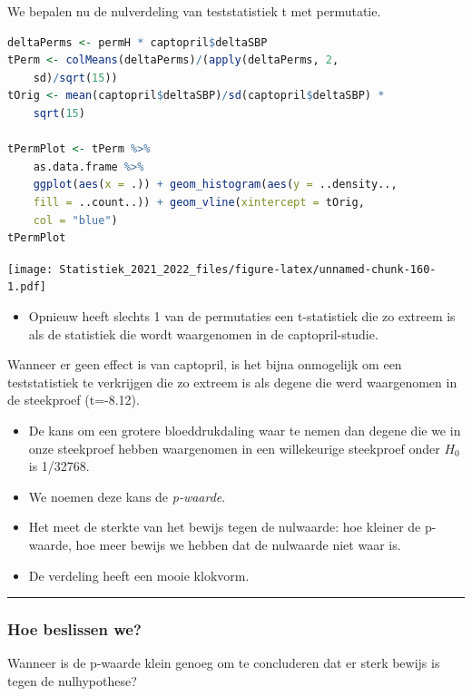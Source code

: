 \documentclass[
  12pt,dutch,coursenotes]{book}
\providecommand{\tightlist}{%
  \setlength{\itemsep}{0pt}\setlength{\parskip}{0pt}}
\theoremstyle{definition}
\theoremstyle{definition}
\theoremstyle{definition}
\theoremstyle{definition}
\theoremstyle{remark}
\begin{document}
We bepalen nu de nulverdeling van teststatistiek t met permutatie.

\begin{lstlisting}[language=R]
deltaPerms <- permH * captopril$deltaSBP
tPerm <- colMeans(deltaPerms)/(apply(deltaPerms, 2,
    sd)/sqrt(15))
tOrig <- mean(captopril$deltaSBP)/sd(captopril$deltaSBP) *
    sqrt(15)

tPermPlot <- tPerm %>%
    as.data.frame %>%
    ggplot(aes(x = .)) + geom_histogram(aes(y = ..density..,
    fill = ..count..)) + geom_vline(xintercept = tOrig,
    col = "blue")
tPermPlot
\end{lstlisting}

\texttt{[image: Statistiek\_2021\_2022\_files/figure-latex/unnamed-chunk-160-1.pdf]}

\begin{itemize}
\tightlist
\item
  Opnieuw heeft slechts 1 van de permutaties een t-statistiek die zo extreem is als de statistiek die wordt waargenomen in de captopril-studie.
\end{itemize}

Wanneer er geen effect is van captopril, is het bijna onmogelijk om een teststatistiek te verkrijgen die zo extreem is als degene die werd waargenomen in de steekproef (t=-8.12).

\begin{itemize}
\item
  De kans om een grotere bloeddrukdaling waar te nemen dan degene die we in onze steekproef hebben waargenomen in een willekeurige steekproef onder \(H_0\) is 1/32768.
\item
  We noemen deze kans de \emph{p-waarde}.
\item
  Het meet de sterkte van het bewijs tegen de nulwaarde: hoe kleiner de p-waarde, hoe meer bewijs we hebben dat de nulwaarde niet waar is.
\item
  De verdeling heeft een mooie klokvorm.
\end{itemize}

\begin{center}\rule{0.5\linewidth}{0.5pt}\end{center}

\hypertarget{hoe-beslissen-we}{%
\subsubsection{Hoe beslissen we?}\label{hoe-beslissen-we}}

Wanneer is de p-waarde klein genoeg om te concluderen dat er sterk bewijs is tegen de nulhypothese?
\end{document}
